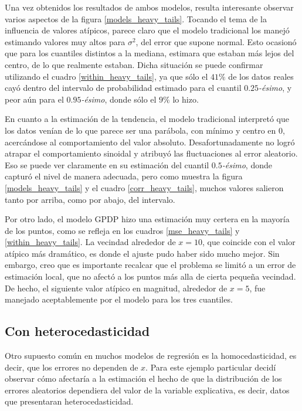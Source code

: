 Una vez obtenidos los resultados de ambos modelos, resulta interesante observar varios aspectos de la figura \ref{models_heavy_tails}. Tocando el tema de la influencia de valores at\'ipicos, parece claro que el modelo tradicional los manej\'o estimando valores muy altos para $\sigma^2$, del error que supone normal. Esto ocasion\'o que para los cuantiles distintos a la mediana, estimara que estaban m\'as lejos del centro, de lo que realmente estaban. Dicha situaci\'on se puede confirmar utilizando el cuadro \ref{within_heavy_tails}, ya que s\'olo el $41\%$ de los datos reales cay\'o dentro del intervalo de probabilidad estimado para el cuantil $0.25$\textit{-\'esimo}, y peor a\'un para el $0.95$\textit{-\'esimo}, donde s\'olo el $9\%$ lo hizo.

En cuanto a la estimaci\'on de la tendencia, el modelo tradicional interpret\'o que los datos ven\'ian de lo que parece ser una par\'abola, con m\'inimo y centro en 0, acerc\'andose al comportamiento del valor absoluto. Desafortunadamente no logr\'o atrapar el comportamiento sinoidal y atribuy\'o las fluctuaciones al error aleatorio. Eso se puede ver claramente en su estimaci\'on del cuantil $0.5$\textit{-\'esimo}, donde captur\'o el nivel de manera adecuada, pero como muestra la figura \ref{models_heavy_tails} y el cuadro \ref{corr_heavy_tails}, muchos valores salieron tanto por arriba, como por abajo, del intervalo.

Por otro lado, el modelo GPDP hizo una estimaci\'on muy certera en la mayor\'ia de los puntos, como se refleja en los cuadros \ref{mse_heavy_tails} y \ref{within_heavy_tails}. La vecindad alrededor de $x = 10$, que coincide con el valor at\'ipico m\'as dram\'atico, es donde el ajuste pudo haber sido mucho mejor. Sin embargo, creo que es importante recalcar que el problema se limit\'o a un error de estimaci\'on local, que no afect\'o a los puntos m\'as alla de cierta pequeña vecindad. De hecho, el siguiente valor at\'ipico en magnitud, alrededor de $x = 5$, fue manejado aceptablemente por el modelo para los tres cuantiles.

\subsection{Con heterocedasticidad}

Otro supuesto com\'un en muchos modelos de regresi\'on es la homocedasticidad, es decir, que los errores no dependen de $x$. Para este ejemplo particular decid\'i observar c\'omo afectar\'ia a la estimaci\'on el hecho de que la distribuci\'on de los errores aleatorios dependiera del valor de la variable explicativa, es decir, datos que presentaran heterocedasticidad.

